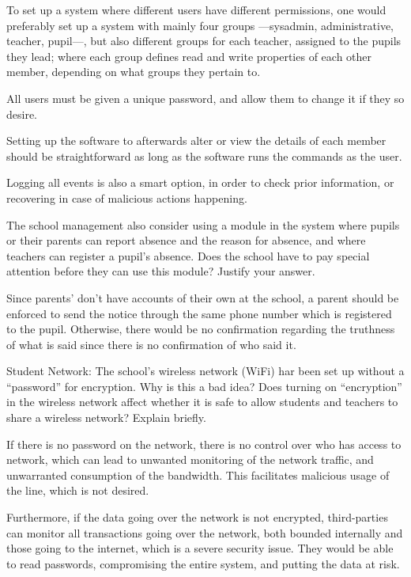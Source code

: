 \documentclass{myassignment}
\begin{document}
	\begin{answer}
		To set up a system where different users have different permissions, one would preferably set up a system with mainly four groups ---sysadmin, administrative, teacher, pupil---, but also different groups for each teacher, assigned to the pupils they lead; where each group defines read and write properties of each other member, depending on what groups they pertain to.

		All users must be given a unique password, and allow them to change it if they so desire. 

		Setting up the software to afterwards alter or view the details of each member should be straightforward as long as the software runs the commands as the user.

		Logging all events is also a smart option, in order to check prior information, or recovering in case of malicious actions happening.
	\end{answer}

	\begin{problem}
		The school management also consider using a module in the system where pupils or their parents can report absence and the reason for absence, and where teachers can register a pupil’s absence. Does the school have to pay special attention before they can use this module? Justify your answer.%
	\end{problem}

	\begin{answer}
		Since parents' don't have accounts of their own at the school, a parent should be enforced to send the notice through the same phone number which is registered to the pupil. Otherwise, there would be no confirmation regarding the truthness of what is said since there is no confirmation of who said it.
	\end{answer}

	\pagebreak
	\begin{problem}
		Student Network: The school’s wireless network (WiFi) har been set up without a ``password'' for encryption. Why is this a bad idea? Does turning on ``encryption'' in the wireless network affect whether it is safe to allow students and teachers to share a wireless network? Explain briefly.%
	\end{problem}

	\begin{answer}
		If there is no password on the network, there is no control over who has access to network, which can lead to unwanted monitoring of the network traffic, and unwarranted consumption of the bandwidth. This facilitates malicious usage of the line, which is not desired.

		Furthermore, if the data going over the network is not encrypted, third-parties can monitor all transactions going over the network, both bounded internally and those going to the internet, which is a severe security issue. They would be able to read passwords, compromising the entire system, and putting the data at risk.
	\end{answer}
\end{document}
